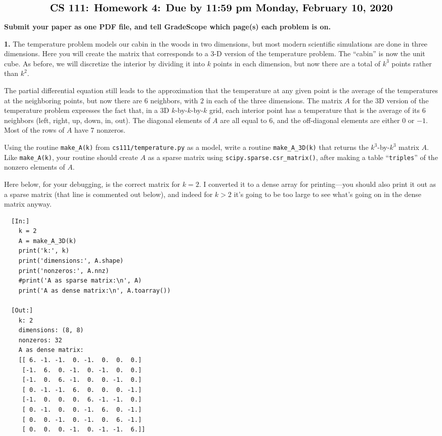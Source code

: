 \documentclass[11pt]{article}
\begin{document}
$$\mbox{\Large \bf CS 111: Homework 4: Due by 11:59 pm Monday, February 10, 2020}$$
\par\smallskip\noindent
{\bf Submit your paper as one PDF file,
and tell GradeScope which page(s) each problem is on.}

\par\bigskip
{\bf 1.}
The temperature problem models our cabin in the woods in two dimensions,
but most modern scientific simulations are done in three dimensions.
Here you will create the matrix that corresponds to a 3-D version of 
the temperature problem. The ``cabin'' is now the unit cube. As before,
we will discretize the interior by dividing it into $k$ points in each
dimension, but now there are a total of $k^3$ points rather than $k^2$.

The partial differential equation still leads to the approximation
that the temperature at any given point is the average of the temperatures
at the neighboring points, but now there are 6 neighbors, 
with $2$ in each of the three dimensions.
The matrix $A$ for the 3D version of the temperature problem
expresses the fact that, in a 3D $k$-by-$k$-by-$k$ grid, 
each interior point has a temperature that is the average of its 6 neighbors 
(left, right, up, down, in, out).
The diagonal elements of $A$ are all equal to $6$, 
and the off-diagonal elements are either $0$ or $-1$.
Most of the rows of $A$ have 7 nonzeros.

Using the routine {\tt make\_A(k)} from {\tt cs111/temperature.py} as a model, 
write a routine {\tt make\_A\_3D(k)} that returns the $k^3$-by-$k^3$ matrix $A$.
Like {\tt make\_A(k)}, your routine should create $A$ as a sparse matrix using
{\tt scipy.sparse.csr\_matrix()}, after making a table ``{\tt triples}'' of
the nonzero elements of $A$.

Here below, for your debugging, is the correct matrix for $k=2$.
I converted it to a dense array for printing---you should also
print it out as a sparse matrix (that line is commented out below), 
and indeed for $k>2$ it's going to be too
large to see what's going on in the dense matrix anyway.

\begin{verbatim}
  [In:]
    k = 2
    A = make_A_3D(k)
    print('k:', k)
    print('dimensions:', A.shape)
    print('nonzeros:', A.nnz)
    #print('A as sparse matrix:\n', A)
    print('A as dense matrix:\n', A.toarray())

  [Out:]
    k: 2
    dimensions: (8, 8)
    nonzeros: 32
    A as dense matrix:
    [[ 6. -1. -1.  0. -1.  0.  0.  0.]
     [-1.  6.  0. -1.  0. -1.  0.  0.]
     [-1.  0.  6. -1.  0.  0. -1.  0.]
     [ 0. -1. -1.  6.  0.  0.  0. -1.]
     [-1.  0.  0.  0.  6. -1. -1.  0.]
     [ 0. -1.  0.  0. -1.  6.  0. -1.]
     [ 0.  0. -1.  0. -1.  0.  6. -1.]
     [ 0.  0.  0. -1.  0. -1. -1.  6.]]
\end{verbatim}
\end{document}
